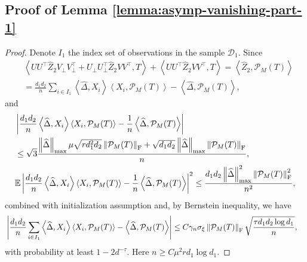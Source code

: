 \documentclass[12pt]{article}
\newcommand{\tF}{{\rm F}}
\newcommand{\abs}[1]{\left\lvert#1\right\rvert}
\newcommand{\norm}[1]{\left\lVert#1\right\rVert}
\newcommand{\E}{\mathbb{E}}
\newcommand{\cP}{\mathcal{P}}
\def\calD{{\mathcal D}}
\theoremstyle{plain}
\begin{document}
\subsection{Proof of Lemma \ref{lemma:asymp-vanishing-part-1}}
\begin{proof}
Denote $I_1$ the index set of observations in the sample $\calD_1$. 
Since 
$$
\begin{aligned}
     &\left\langle U U^\top \widehat{Z}_2 V_{\perp} V_{\perp}^\top + U_{\perp} U^\top_{\perp} \widehat{Z}_2 VV^\top, T \right\rangle +\left\langle UU^\top \widehat{Z}_2VV^\top, T\right\rangle = \left\langle \widehat{Z}_2, \cP_M(T)  \right\rangle\\ 
     &= \frac{d_1d_2}{n}\sum_{i\in I_1 }\left\langle \widehat{\Delta}, X_i \right\rangle \left\langle X_i, \cP_M(T) \right\rangle - \left\langle \widehat{\Delta}, \cP_M(T) \right\rangle,
\end{aligned}
$$
and 
$$
\begin{aligned}
     &\abs{\frac{d_1d_2}{n}\left\langle \widehat{\Delta}, X_i \right\rangle \left\langle X_i, \cP_M(T) \right\rangle - \frac{1}{n}\left\langle \widehat{\Delta}, \cP_M(T) \right\rangle} \\
     & \le\sqrt{3} \frac{\norm{\widehat{\Delta}}_{\max} \mu \sqrt{rd_1^2 d_2} \norm{\cP_M(T)}_\tF +\sqrt{d_1 d_2}\norm{\widehat{\Delta}}_{\max}\norm{\cP_M(T)}_\tF  }{n}, \\
     &\E \abs{\frac{d_1d_2}{n}\left\langle \widehat{\Delta}, X_i \right\rangle \left\langle X_i, \cP_M(T) \right\rangle - \frac{1}{n}\left\langle \widehat{\Delta}, \cP_M(T) \right\rangle}^2 \le \frac{d_1 d_2 \norm{\widehat{\Delta}}_{\max}^2 \norm{\cP_M(T)}_\tF^2 }{n^2},
\end{aligned}
$$
combined with initialization assumption and, by Bernstein inequality, we have 
$$
\begin{aligned}
     &\abs{\frac{d_1d_2}{n}\sum_{i\in I_1 }\left\langle \widehat{\Delta}, X_i \right\rangle \left\langle X_i, \cP_M(T) \right\rangle - \left\langle \widehat{\Delta}, \cP_M(T) \right\rangle}\le C \gamma_{n}\sigma_\xi\norm{\cP_M(T)}_\tF \sqrt{\frac{\tau d_1 d_2\log d_1 }{n}}, 
\end{aligned}
$$
with probability at least $1- 2 d^{-\tau}$. Here $n \geq C \mu_{ }^2 r d_1 \log d_1$.
\end{proof}
\end{document}
